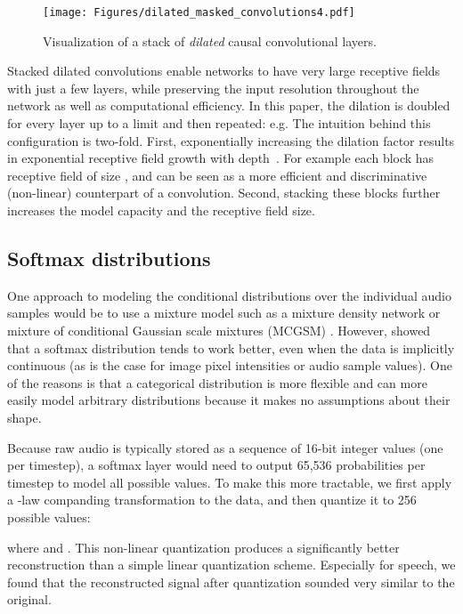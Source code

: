 \documentclass{article}
\makeatletter
\newcommand*{\eg}{e.g.\@\xspace}
\makeatother
\begin{document}
\begin{figure}[ht]
\centering
\texttt{[image: Figures/dilated\_masked\_convolutions4.pdf]}
\caption{Visualization of a stack of \emph{dilated} causal convolutional layers.}
\label{fig:masked_dilated_convolution}
\end{figure}

Stacked dilated convolutions enable networks to have very large receptive fields with just a few layers, while preserving the input resolution throughout the network as well as computational efficiency. In this paper, the dilation is doubled for every layer up to a limit and then repeated: \eg 
The intuition behind this configuration is two-fold. First, exponentially increasing the dilation factor results in exponential receptive field growth with depth~\citep{YuKoltun2016}.  For example each  block has receptive field of size , and can be seen as a more efficient and discriminative (non-linear) counterpart of a  convolution. Second, stacking these blocks further increases the model capacity and the receptive field size.

\subsection{Softmax distributions}

One approach to modeling the conditional distributions  over the individual audio samples would be to use a mixture model such as a mixture density network \citep{MDN} or mixture of conditional Gaussian scale mixtures (MCGSM) \citep{theis2015generative}.
However, \cite{van2016pixel} showed that a softmax distribution tends to work better, even when the data is implicitly continuous (as is the case for image pixel intensities or audio sample values). One of the reasons is that a categorical distribution is more flexible and can more easily model arbitrary distributions because it makes no assumptions about their shape.

Because raw audio is typically stored as a sequence of 16-bit integer values (one per timestep), a softmax layer would need to output 65,536 probabilities per timestep to model all possible values. To make this more tractable, we first apply a -law companding transformation \citep{G711} to the data, and then quantize it to 256 possible values:

where  and . 
This non-linear quantization produces a significantly better reconstruction than a simple linear quantization scheme. Especially for speech, we found that the reconstructed signal after quantization sounded very similar to the original.
\end{document}
